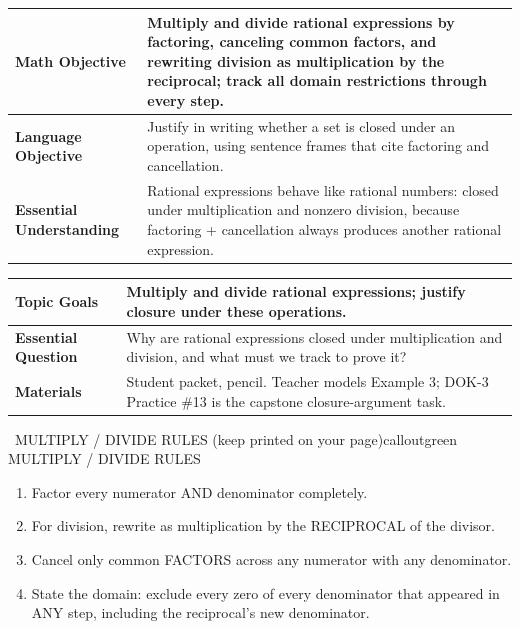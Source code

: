 \documentclass[11pt]{article}
\begin{document}

{\small
\renewcommand{\arraystretch}{1.25}
\noindent\begin{tabular}{|p{1.8in}|p{4.8in}|}
\hline
\textbf{Math Objective} & Multiply and divide rational expressions by factoring, canceling common factors, and rewriting division as multiplication by the reciprocal; track all domain restrictions through every step. \\ \hline
\textbf{Language Objective} & Justify in writing whether a set is closed under an operation, using sentence frames that cite factoring and cancellation. \\ \hline
\textbf{Essential Understanding} & Rational expressions behave like rational numbers: closed under multiplication and nonzero division, because factoring + cancellation always produces another rational expression. \\ \hline
\end{tabular}
}

{\small
\renewcommand{\arraystretch}{1.25}
\noindent\begin{tabular}{|p{1.8in}|p{4.8in}|}
\hline
\textbf{Topic Goals} & Multiply and divide rational expressions; justify closure under these operations. \\ \hline
\textbf{Essential Question} & Why are rational expressions closed under multiplication and division, and what must we track to prove it? \\ \hline
\textbf{Materials} & Student packet, pencil. Teacher models Example 3; DOK-3 Practice \#13 is the capstone closure-argument task. \\ \hline
\end{tabular}
}


\begin{callout}{\IconBook\ MULTIPLY / DIVIDE RULES (keep printed on your page)}{calloutgreen}
MULTIPLY / DIVIDE RULES
\begin{enumerate}[leftmargin=2.1em,itemsep=1pt,topsep=4pt]
  \item Factor every numerator AND denominator completely.
  \item For division, rewrite as multiplication by the RECIPROCAL of the divisor.
  \item Cancel only common FACTORS across any numerator with any denominator.
  \item State the domain: exclude every zero of every denominator that appeared in ANY step, including the reciprocal's new denominator.
\end{enumerate}
\end{callout}
\end{document}
